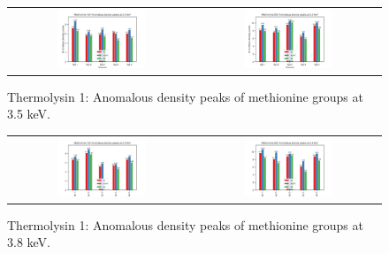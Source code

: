 \begin{figure}
    \centering
    \begin{tabular}{cc}
        \includegraphics[width = 0.5\textwidth]{plots/exp1/tlys_9_P6122/peaks/3p5_met120_peaks.png} & \includegraphics[width = 0.5\textwidth]{plots/exp1/tlys_9_P6122/peaks/3p5_met205_peaks.png}
    \end{tabular}
    \caption{Thermolysin 1: Anomalous density peaks of methionine groups at 3.5 \unit{keV}.}
    \label{fig:tlys9_met_peaks_3p5}
\end{figure}

\begin{figure}
    \centering
    \begin{tabular}{cc}
        \includegraphics[width = 0.5\textwidth]{plots/exp1/tlys_9_P6122/peaks/3p8_met120_peaks.png} & \includegraphics[width = 0.5\textwidth]{plots/exp1/tlys_9_P6122/peaks/3p8_met205_peaks.png}
    \end{tabular}
    \caption{Thermolysin 1: Anomalous density peaks of methionine groups at 3.8 \unit{keV}.}
    \label{fig:tlys9_met_peaks_3p8}
\end{figure}

